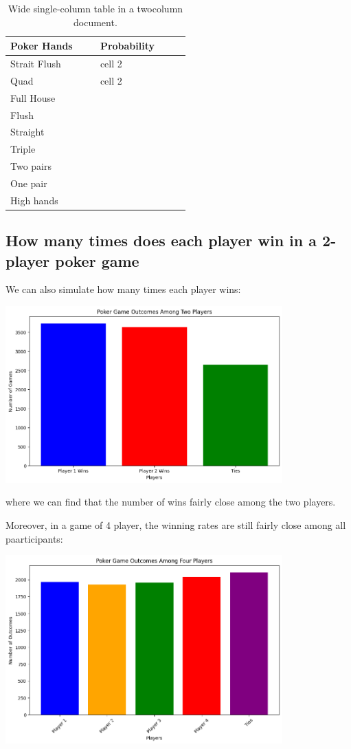 \documentclass{article}
\begin{document}
\begin{table}[ht]
    \caption{Wide single-column table in a twocolumn document.}
    \centering
    \begin{tabular}{p{0.4\linewidth} | p{0.4\linewidth}}
    \hline
    Poker Hands & Probability \\
    \hline
    Strait Flush & cell 2 \\
    Quad & cell 2 \\
    Full House &  \\
    Flush &  \\
    Straight & \\ 
    Triple & \\ 
    Two pairs & \\
    One pair & \\ 
    High hands
    \hline
    \end{tabular}
\end{table}




\subsection*{How many times does each player win in a 2-player poker game}

We can also simulate how many times each player wins:

\begin{center}
    \includegraphics[width = 0.8\textwidth]{images/win_rate_2_player.png}
\end{center}

where we can find that the number of wins fairly close among the 
two players.

Moreover, in a game of 4 player, the winning rates are still fairly close 
among all paarticipants:

\begin{center}
    \includegraphics[width = 0.8\textwidth]{images/win_rate_4_player.png}
\end{center}
\end{document}
